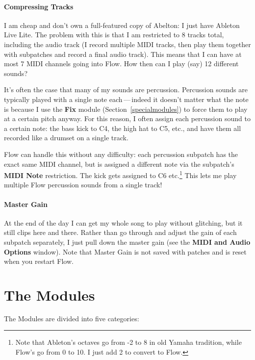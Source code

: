 \documentclass{article}
\begin{document}
\paragraph{Compressing Tracks} I am cheap and don't own a full-featured copy of Abelton: I just have Ableton Live Lite.  The problem with this is that I am restricted to 8 tracks total, including the audio track (I record multiple MIDI tracks, then play them together with subpatches and record a final audio track).  This means that I can have at most 7 MIDI channels going into Flow.  How then can I play (say) 12 different sounds?

It's often the case that many of my sounds are percussion.  Percussion sounds are typically played with a single note each\,---\,indeed it doesn't matter what the note is because I use the {\bf Fix} module (Section~\ref{specialmodules}) to force them to play at a certain pitch anyway.  For this reason, I often assign each percussion sound to a certain note: the bass kick to C4, the high hat to C5, etc., and have them all recorded like a drumset on a single track.

Flow can handle this without any difficulty: each percussion subpatch has the exact same MIDI channel, but is assigned a different   note via the subpatch's {\bf MIDI Note} restriction.  The kick gets assigned to C6 etc.\footnote{Note that Ableton's octaves go from -2 to 8 in old Yamaha tradition, while Flow's go from 0 to 10.  I just add 2 to convert to Flow.}  This lets me play multiple Flow percussion sounds from a single track!

\paragraph{Master Gain} At the end of the day I can get my whole song to play without glitching, but it still clips here and there.  Rather than go through and adjust the gain of each subpatch separately, I just pull down the master gain (see the {\bf MIDI and Audio Options} window).     Note that Master Gain is not saved with patches and is reset when you restart Flow.

\section{The Modules}

The Modules are divided into five categories:
\end{document}
